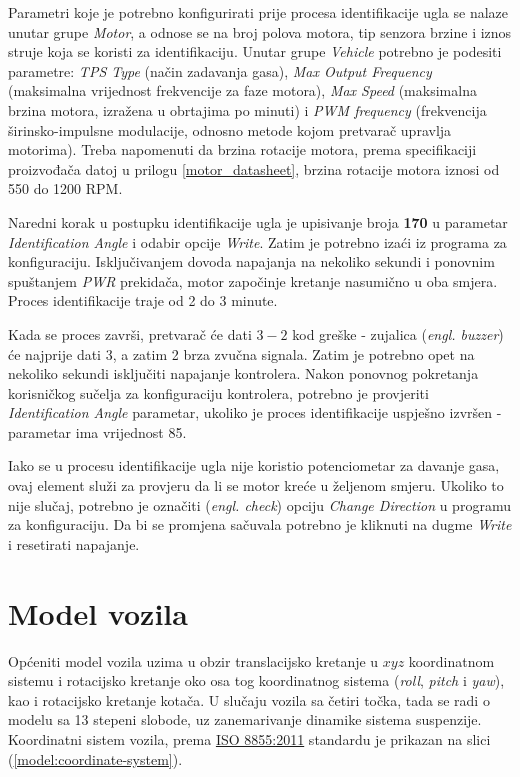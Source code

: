 Parametri koje je potrebno konfigurirati prije procesa identifikacije ugla se nalaze unutar grupe \textit{Motor}, a odnose se na broj polova motora, tip senzora brzine i iznos struje koja se koristi za identifikaciju. Unutar grupe \textit{Vehicle} potrebno je podesiti parametre: \textit{TPS Type} (način zadavanja gasa), \textit{Max Output Frequency} (maksimalna vrijednost frekvencije za faze motora), \textit{Max Speed} (maksimalna brzina motora, izražena u obrtajima po minuti) i \textit{PWM frequency} (frekvencija širinsko-impulsne modulacije, odnosno metode kojom pretvarač upravlja motorima). Treba napomenuti da brzina rotacije motora, prema specifikaciji proizvođača datoj u prilogu \ref{motor_datasheet}, brzina rotacije motora iznosi od 550 do 1200 RPM.

Naredni korak u postupku identifikacije ugla je upisivanje broja \textbf{170} u parametar \textit{Identification Angle} i odabir opcije \textit{Write}. Zatim je potrebno izaći iz programa za konfiguraciju. Isključivanjem dovoda napajanja na nekoliko sekundi i ponovnim spuštanjem \textit{PWR} prekidača, motor započinje kretanje nasumično u oba smjera. Proces identifikacije traje od 2 do 3 minute.

Kada se proces završi, pretvarač će dati $3-2$ kod greške - zujalica (\textit{engl. buzzer}) će najprije dati 3, a zatim 2 brza zvučna signala. Zatim je potrebno opet na nekoliko sekundi isključiti napajanje kontrolera. Nakon ponovnog pokretanja korisničkog sučelja za konfiguraciju kontrolera, potrebno je provjeriti \textit{Identification Angle} parametar, ukoliko je proces identifikacije uspješno izvršen - parametar ima vrijednost 85.

Iako se u procesu identifikacije ugla nije koristio potenciometar za davanje gasa, ovaj element služi za provjeru da li se motor kreće u željenom smjeru. Ukoliko to nije slučaj, potrebno je označiti (\textit{engl. check}) opciju \textit{Change Direction} u programu za konfiguraciju. Da bi se promjena sačuvala potrebno je kliknuti na dugme \textit{Write} i resetirati napajanje.

\section{Model vozila}

\qquad Općeniti model vozila uzima u obzir translacijsko kretanje u $xyz$ koordinatnom sistemu i rotacijsko kretanje oko osa tog koordinatnog sistema (\textit{roll}, \textit{pitch} i \textit{yaw}), kao i rotacijsko kretanje kotača. U slučaju vozila sa četiri točka, tada se radi o modelu sa 13 stepeni slobode, uz zanemarivanje dinamike sistema suspenzije. Koordinatni sistem vozila, prema \href{https://www.iso.org/standard/51180.html}{ISO 8855:2011} standardu je prikazan na slici (\ref{model:coordinate-system}).

